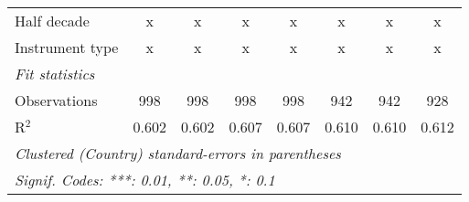 \begin{tabular}{lccccccc}
   Half decade                                                                                    & x       & x       & x            & x            & x            & x            & x\\  
   Instrument type                                                                                & x       & x       & x            & x            & x            & x            & x\\  
   \midrule \emph{Fit statistics}\\
   Observations                                                                                   & 998     & 998     & 998          & 998          & 942          & 942          & 928\\  
   R$^2$                                                                                          & 0.602   & 0.602   & 0.607        & 0.607        & 0.610        & 0.610        & 0.612\\  
   \midrule
   \multicolumn{8}{l}{\emph{Clustered (Country) standard-errors in parentheses}}\\
   \multicolumn{8}{l}{\emph{Signif. Codes: ***: 0.01, **: 0.05, *: 0.1}}\\
\end{tabular}
\par\endgroup


